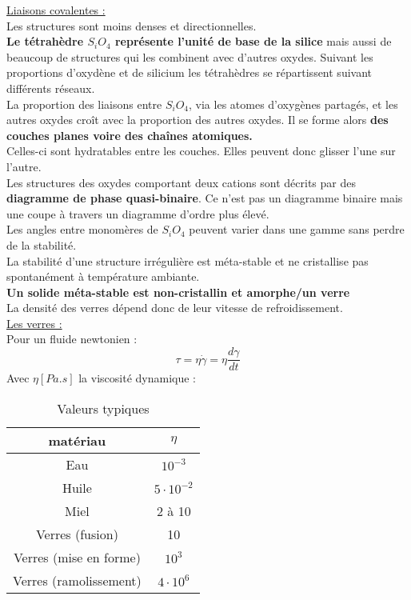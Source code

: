 \documentclass[../main.tex]{subfiles}
\begin{document}
\quad \underline{Liaisons covalentes :}\\
Les structures sont moins denses et directionnelles.\\
\textbf{Le tétrahèdre $S_iO_4$ représente l'unité de base de la silice} mais aussi de beaucoup de structures qui les combinent avec d'autres oxydes. Suivant les proportions d'oxydène et de silicium les tétrahèdres se répartissent suivant différents réseaux.\\

La proportion des liaisons entre $S_iO_4$, via les atomes d'oxygènes partagés, et les autres oxydes croît avec la proportion des autres oxydes. Il se forme alors \textbf{des couches planes voire des chaînes atomiques.}\\
Celles-ci sont hydratables entre les couches. Elles peuvent donc glisser l'une sur l'autre. \\

Les structures des oxydes comportant deux cations sont décrits par des \textbf{diagramme de phase quasi-binaire}. \color{gray} Ce n'est pas un diagramme binaire mais une coupe à travers un diagramme d'ordre plus élevé. \color{black}\\

Les angles entre monomères de $S_iO_4$ peuvent varier dans une gamme sans perdre de la stabilité.\\

La stabilité d'une structure irrégulière est méta-stable et ne cristallise pas spontanément à température ambiante.\\

\textbf{Un solide méta-stable est non-cristallin et amorphe/un verre}\\
La densité des verres dépend donc de leur vitesse de refroidissement.\\

\quad \underline{Les verres :}\\
Pour un fluide newtonien : \\
\begin{equation}
    \tau = \eta \dot{\gamma} = \eta \frac{d \gamma}{dt}
\end{equation}
Avec $\eta[Pa.s]$ la viscosité dynamique : \\
\begin{table}[hbt!]
    \centering
    \begin{tabular}{||c|c|}
    \hline
        matériau & $\eta$ \\
        \hline
        Eau & $10^{-3}$\\
        Huile & $5\cdot 10^{-2}$\\
        Miel & 2 à 10\\
        Verres (fusion) & 10\\
        Verres (mise en forme) & $10^3$\\
        Verres (ramolissement) & $4\cdot 10^6$\\
        \hline
    \end{tabular}
    \caption{Valeurs typiques}
     
\end{table}
\end{document}
